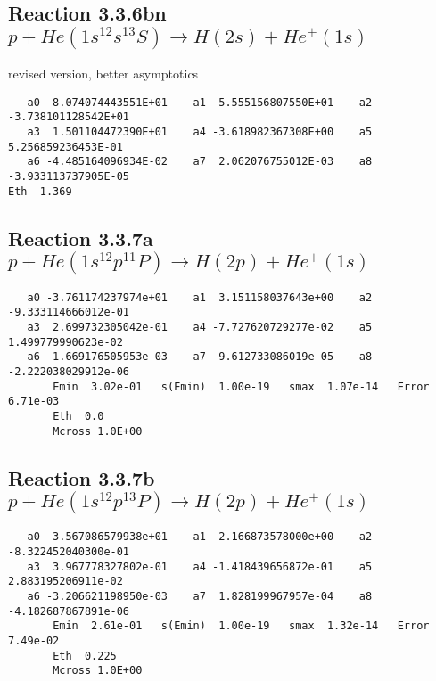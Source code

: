 \documentclass[12pt,dvipdfm]{article}
\begin{document}
\subsection{
Reaction 3.3.6bn $   p + He(1s^12s^13S) \rightarrow H(2s) + He^+(1s)$}
revised version,  better asymptotics

\begin{small}\begin{verbatim}
   a0 -8.074074443551E+01    a1  5.555156807550E+01    a2 -3.738101128542E+01
   a3  1.501104472390E+01    a4 -3.618982367308E+00    a5  5.256859236453E-01
   a6 -4.485164096934E-02    a7  2.062076755012E-03    a8 -3.933113737905E-05
Eth  1.369
\end{verbatim}\end{small}
\newpage

\subsection{
Reaction 3.3.7a $   p + He(1s^12p^11P) \rightarrow H(2p) + He^+(1s)$}


\begin{small}\begin{verbatim}
   a0 -3.761174237974e+01    a1  3.151158037643e+00    a2 -9.333114666012e-01
   a3  2.699732305042e-01    a4 -7.727620729277e-02    a5  1.499779990623e-02
   a6 -1.669176505953e-03    a7  9.612733086019e-05    a8 -2.222038029912e-06
       Emin  3.02e-01   s(Emin)  1.00e-19   smax  1.07e-14   Error  6.71e-03
       Eth  0.0
       Mcross 1.0E+00
\end{verbatim}\end{small}

\newpage
\subsection{
Reaction 3.3.7b $   p + He(1s^12p^13P) \rightarrow H(2p) + He^+(1s)$}


\begin{small}\begin{verbatim}
   a0 -3.567086579938e+01    a1  2.166873578000e+00    a2 -8.322452040300e-01
   a3  3.967778327802e-01    a4 -1.418439656872e-01    a5  2.883195206911e-02
   a6 -3.206621198950e-03    a7  1.828199967957e-04    a8 -4.182687867891e-06
       Emin  2.61e-01   s(Emin)  1.00e-19   smax  1.32e-14   Error  7.49e-02
       Eth  0.225
       Mcross 1.0E+00
\end{verbatim}\end{small}
\end{document}
